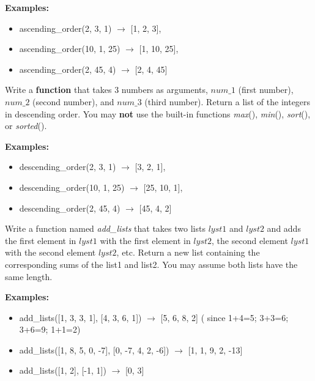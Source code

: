	\textbf{Examples:}
	\begin{itemize}
		\item  ascending\_order(2, 3, 1) $\rightarrow$ [1, 2, 3], 
		\item  ascending\_order(10, 1, 25) $\rightarrow$ [1, 10, 25], 
		\item  ascending\_order(2, 45, 4) $\rightarrow$ [2, 4, 45] 
	\end{itemize}


	\item
		Write a \textbf{function} that takes 3 numbers as arguments, $num\_1$ (first number), 
		$num\_2$ (second number), and $num\_3$ (third number). 
		Return a list of the integers in descending order. 
		You may \textbf{not} use the built-in functions \textit{max}(), \textit{min}(), 
		\textit{sort}(), or \textit{sorted}().
		
	\textbf{Examples:}
	\begin{itemize}
		\item  descending\_order(2, 3, 1) $\rightarrow$ [3, 2, 1], 
		\item  descending\_order(10, 1, 25) $\rightarrow$ [25, 10, 1], 
		\item  descending\_order(2, 45, 4) $\rightarrow$ [45, 4, 2] 
	\end{itemize}



	\item 
		Write a function named \textit{add\_lists} that takes two lists $lyst1$ and $lyst2$ and adds the 
		first element in $lyst1$ with the first element in $lyst2$, the second element $lyst1$
		with the second element $lyst2$, etc. Return a new list containing the corresponding 
		sums of the list1 and list2.  You may assume both lists have the same length.

		\textbf{Examples:}		
		\begin{itemize}
			\item  add\_lists([1, 3, 3, 1], [4, 3, 6, 1]) $\rightarrow$ [5, 6, 8, 2] 
				( since 1+4=5; 3+3=6; 3+6=9; 1+1=2)
			\item  add\_lists([1, 8, 5, 0, -7], [0, -7, 4, 2, -6]) $\rightarrow$ [1, 1, 9, 2, -13]
			\item  add\_lists([1, 2], [-1, 1]) $\rightarrow$ [0, 3]
		\end{itemize}


